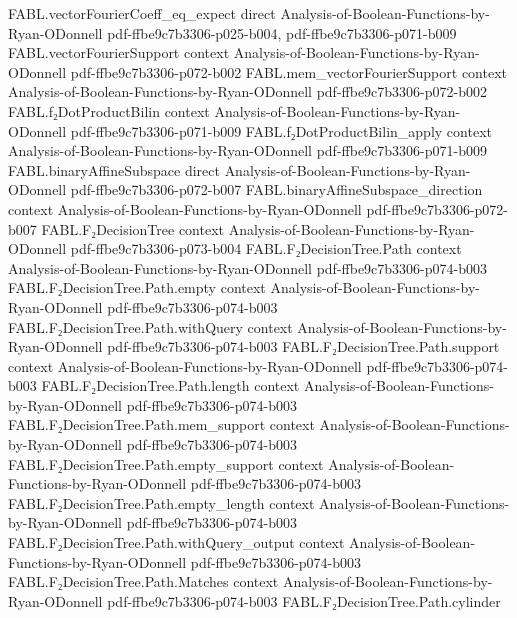 \begin{theorem}
\proofstep
  {FABL.vectorFourierCoeff_eq_expect}
  {direct}
  {Analysis-of-Boolean-Functions-by-Ryan-ODonnell}
  {pdf-ffbe9c7b3306-p025-b004,
    pdf-ffbe9c7b3306-p071-b009}
\proofstep
  {FABL.vectorFourierSupport}
  {context}
  {Analysis-of-Boolean-Functions-by-Ryan-ODonnell}
  {pdf-ffbe9c7b3306-p072-b002}
\proofstep
  {FABL.mem_vectorFourierSupport}
  {context}
  {Analysis-of-Boolean-Functions-by-Ryan-ODonnell}
  {pdf-ffbe9c7b3306-p072-b002}
\proofstep
  {FABL.f₂DotProductBilin}
  {context}
  {Analysis-of-Boolean-Functions-by-Ryan-ODonnell}
  {pdf-ffbe9c7b3306-p071-b009}
\proofstep
  {FABL.f₂DotProductBilin_apply}
  {context}
  {Analysis-of-Boolean-Functions-by-Ryan-ODonnell}
  {pdf-ffbe9c7b3306-p071-b009}
\proofstep
  {FABL.binaryAffineSubspace}
  {direct}
  {Analysis-of-Boolean-Functions-by-Ryan-ODonnell}
  {pdf-ffbe9c7b3306-p072-b007}
\proofstep
  {FABL.binaryAffineSubspace_direction}
  {context}
  {Analysis-of-Boolean-Functions-by-Ryan-ODonnell}
  {pdf-ffbe9c7b3306-p072-b007}
\proofstep
  {FABL.F₂DecisionTree}
  {context}
  {Analysis-of-Boolean-Functions-by-Ryan-ODonnell}
  {pdf-ffbe9c7b3306-p073-b004}
\proofstep
  {FABL.F₂DecisionTree.Path}
  {context}
  {Analysis-of-Boolean-Functions-by-Ryan-ODonnell}
  {pdf-ffbe9c7b3306-p074-b003}
\proofstep
  {FABL.F₂DecisionTree.Path.empty}
  {context}
  {Analysis-of-Boolean-Functions-by-Ryan-ODonnell}
  {pdf-ffbe9c7b3306-p074-b003}
\proofstep
  {FABL.F₂DecisionTree.Path.withQuery}
  {context}
  {Analysis-of-Boolean-Functions-by-Ryan-ODonnell}
  {pdf-ffbe9c7b3306-p074-b003}
\proofstep
  {FABL.F₂DecisionTree.Path.support}
  {context}
  {Analysis-of-Boolean-Functions-by-Ryan-ODonnell}
  {pdf-ffbe9c7b3306-p074-b003}
\proofstep
  {FABL.F₂DecisionTree.Path.length}
  {context}
  {Analysis-of-Boolean-Functions-by-Ryan-ODonnell}
  {pdf-ffbe9c7b3306-p074-b003}
\proofstep
  {FABL.F₂DecisionTree.Path.mem_support}
  {context}
  {Analysis-of-Boolean-Functions-by-Ryan-ODonnell}
  {pdf-ffbe9c7b3306-p074-b003}
\proofstep
  {FABL.F₂DecisionTree.Path.empty_support}
  {context}
  {Analysis-of-Boolean-Functions-by-Ryan-ODonnell}
  {pdf-ffbe9c7b3306-p074-b003}
\proofstep
  {FABL.F₂DecisionTree.Path.empty_length}
  {context}
  {Analysis-of-Boolean-Functions-by-Ryan-ODonnell}
  {pdf-ffbe9c7b3306-p074-b003}
\proofstep
  {FABL.F₂DecisionTree.Path.withQuery_output}
  {context}
  {Analysis-of-Boolean-Functions-by-Ryan-ODonnell}
  {pdf-ffbe9c7b3306-p074-b003}
\proofstep
  {FABL.F₂DecisionTree.Path.Matches}
  {context}
  {Analysis-of-Boolean-Functions-by-Ryan-ODonnell}
  {pdf-ffbe9c7b3306-p074-b003}
\proofstep
  {FABL.F₂DecisionTree.Path.cylinder}

\end{theorem}
